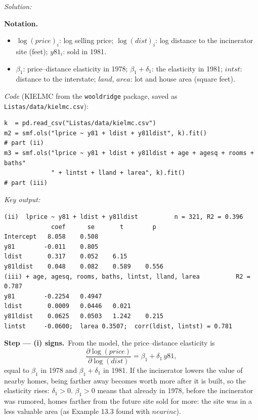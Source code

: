 \documentclass[11pt,a4paper]{article}
\newif\ifsolucoes
\newcommand{\espacoresol}{4.5cm}   %
\newenvironment{notacao}{\par\smallskip\noindent\textbf{Notation.}\begin{itemize}[leftmargin=1.4em,topsep=1pt,itemsep=0pt]\small}{\end{itemize}}
\newcommand{\resolespaco}{\ifsolucoes\else\par\textit{Solution:}\vspace{\espacoresol}\par\fi}
\newcommand{\passo}[2]{\par\smallskip\noindent\textbf{Step --- #1.}~#2}
\begin{document}
\resolespaco
\begin{sol}
\begin{notacao}
\item $\log(price)_i$: log selling price; $\log(dist)_i$: log distance to the incinerator site (feet);
$y81_i$: sold in 1981.
\item $\beta_1$: price--distance elasticity in 1978; $\beta_1+\delta_1$: the elasticity in 1981;
$intst$: distance to the interstate; $land$, $area$: lot and house area (square feet).
\end{notacao}

\noindent\textit{Code} (KIELMC from the \texttt{wooldridge} package, saved as \texttt{Listas/data/kielmc.csv}):
\begingroup\footnotesize
\begin{verbatim}
k  = pd.read_csv("Listas/data/kielmc.csv")
m2 = smf.ols("lprice ~ y81 + ldist + y81ldist", k).fit()                          # part (ii)
m3 = smf.ols("lprice ~ y81 + ldist + y81ldist + age + agesq + rooms + baths"
             " + lintst + lland + larea", k).fit()                                # part (iii)
\end{verbatim}
\endgroup
\noindent\textit{Key output:}
\begingroup\footnotesize
\begin{verbatim}
(ii)  lprice ~ y81 + ldist + y81ldist          n = 321, R2 = 0.396
             coef      se       t        p
Intercept   8.058    0.508
y81        -0.011    0.805
ldist       0.317    0.052    6.15
y81ldist    0.048    0.082    0.589    0.556
(iii) + age, agesq, rooms, baths, lintst, lland, larea          R2 = 0.787
y81        -0.2254   0.4947
ldist       0.0009   0.0446   0.021
y81ldist    0.0625   0.0503   1.242    0.215
lintst     -0.0600;  larea 0.3507;  corr(ldist, lintst) = 0.781
\end{verbatim}
\endgroup

\passo{(i) signs}{From the model, the price--distance elasticity is
\begin{equation}
\frac{\partial\log(price)}{\partial\log(dist)}=\beta_1+\delta_1\,y81,\label{q11:elas}
\end{equation}
equal to $\beta_1$ in 1978 and $\beta_1+\delta_1$ in 1981. If the incinerator lowers the value of nearby
homes, being farther away becomes worth more after it is built, so the elasticity rises: $\delta_1>0$.
$\beta_1>0$ means that already in 1978, before the incinerator was rumored, homes farther from the future
site sold for more: the site was in a less valuable area (as Example 13.3 found with $nearinc$).}


\end{sol}
\end{document}
